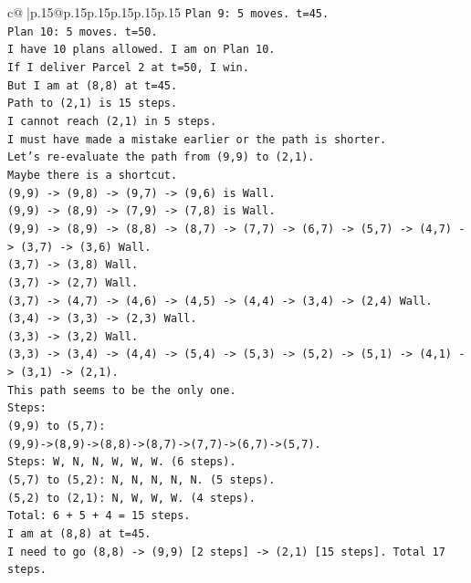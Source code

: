 \documentclass{article}
\begin{document}
{\begin{supertabular}{c@{$\;$}|p{.15\linewidth}@{}p{.15\linewidth}p{.15\linewidth}p{.15\linewidth}p{.15\linewidth}p{.15\linewidth}}
{{{\texttt{Plan 9: 5 moves. t=45.} \\
\texttt{Plan 10: 5 moves. t=50.} \\
\texttt{I have 10 plans allowed. I am on Plan 10.} \\
\texttt{If I deliver Parcel 2 at t=50, I win.} \\
\texttt{But I am at (8,8) at t=45.} \\
\texttt{Path to (2,1) is 15 steps.} \\
\texttt{I cannot reach (2,1) in 5 steps.} \\
\texttt{I must have made a mistake earlier or the path is shorter.} \\
\texttt{Let's re{-}evaluate the path from (9,9) to (2,1).} \\
\texttt{Maybe there is a shortcut.} \\
\texttt{(9,9) {-}> (9,8) {-}> (9,7) {-}> (9,6) is Wall.} \\
\texttt{(9,9) {-}> (8,9) {-}> (7,9) {-}> (7,8) is Wall.} \\
\texttt{(9,9) {-}> (8,9) {-}> (8,8) {-}> (8,7) {-}> (7,7) {-}> (6,7) {-}> (5,7) {-}> (4,7) {-}> (3,7) {-}> (3,6) Wall.} \\
\texttt{(3,7) {-}> (3,8) Wall.} \\
\texttt{(3,7) {-}> (2,7) Wall.} \\
\texttt{(3,7) {-}> (4,7) {-}> (4,6) {-}> (4,5) {-}> (4,4) {-}> (3,4) {-}> (2,4) Wall.} \\
\texttt{(3,4) {-}> (3,3) {-}> (2,3) Wall.} \\
\texttt{(3,3) {-}> (3,2) Wall.} \\
\texttt{(3,3) {-}> (3,4) {-}> (4,4) {-}> (5,4) {-}> (5,3) {-}> (5,2) {-}> (5,1) {-}> (4,1) {-}> (3,1) {-}> (2,1).} \\
\texttt{This path seems to be the only one.} \\
\texttt{Steps:} \\
\texttt{(9,9) to (5,7):} \\
\texttt{(9,9){-}>(8,9){-}>(8,8){-}>(8,7){-}>(7,7){-}>(6,7){-}>(5,7).} \\
\texttt{Steps: W, N, N, W, W, W. (6 steps).} \\
\texttt{(5,7) to (5,2): N, N, N, N, N. (5 steps).} \\
\texttt{(5,2) to (2,1): N, W, W, W. (4 steps).} \\
\texttt{Total: 6 + 5 + 4 = 15 steps.} \\
\texttt{I am at (8,8) at t=45.} \\
\texttt{I need to go (8,8) {-}> (9,9) {[}2 steps{]} {-}> (2,1) {[}15 steps{]}. Total 17 steps.} \\
}}}
\end{supertabular}}
\end{document}
